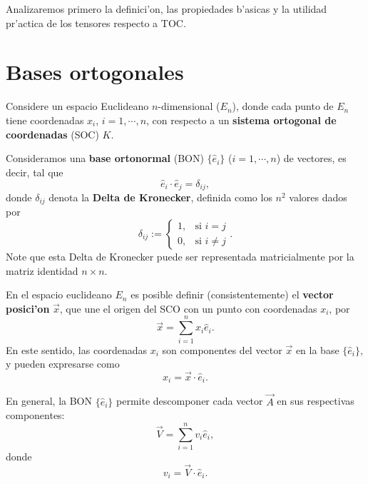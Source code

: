 Analizaremos primero la definici'on, las propiedades b'asicas y la utilidad pr'actica de los tensores respecto a TOC.

\section{Bases ortogonales}

Considere un espacio Euclideano $n$-dimensional ($E_n$), donde cada punto de $E_n$ tiene coordenadas $x_i$, $i=1,\cdots, n$, con respecto a un \textbf{sistema ortogonal de coordenadas} (SOC) $K$. 

Consideramos una \textbf{base ortonormal} (BON) $\lbrace\hat{e}_i\rbrace$ ($i=1,\cdots, n$) de vectores, es decir, tal que
\begin{equation}
\boxed{\hat{e}_i\cdot \hat{e}_j=\delta_{ij},}
\end{equation}
donde $\delta_{ij}$ denota la \textbf{Delta de Kronecker}, definida como los $n^2$ valores dados por
\begin{equation} \label{DK}
\delta_{ij}:=\begin{cases} 1, & \text{si } i=j \\ 0, & \text{si } i\neq j\end{cases} .
\end{equation}
Note que esta Delta de Kronecker puede ser representada matricialmente por la matriz identidad $n\times n$. 

En el espacio euclideano $E_n$ es posible definir (consistentemente) el \textbf{vector posici'on} $\vec{x}$, que une el origen del SCO con un punto con coordenadas $x_i$, por
\begin{equation}
\vec{x}=\sum_{i=1}^n x_i\hat{e}_i.
\end{equation}
En este sentido, las coordenadas $x_i$ son componentes del vector $\vec{x}$ en la base $\lbrace\hat{e}_i\rbrace$, y pueden expresarse como
\begin{equation}\label{x2}
x_i=\vec{x}\cdot\hat{e}_i.
\end{equation}

En general, la BON $\lbrace\hat{e}_i\rbrace$ permite descomponer cada vector $\vec{A}$ en sus respectivas componentes:
\begin{equation}\label{V1}
\vec{V}=\sum_{i=1}^nv_i\hat{e}_i,
\end{equation}
donde
\begin{equation}\label{v2}
v_i=\vec{V}\cdot\hat{e}_i.
\end{equation}


